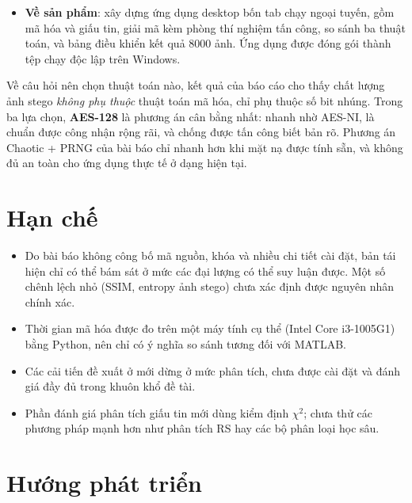 \begin{itemize}
        nêu. Lớp Chaotic + PRNG bị phá hoàn toàn bởi tấn công biết bản rõ và không có tính khuếch tán
        (đổi một điểm ảnh chỉ đổi một byte bản mã). CBC với IV cố định chỉ khuếch tán về phía sau.
        Giấu tin LSB thay thế bị kiểm định $\chi^2$ phát hiện ở $99.84\%$ ảnh stego và bị phá hủy bởi
        nén JPEG hay nhiễu nhẹ.
  \item \textbf{Về sản phẩm}: xây dựng ứng dụng desktop bốn tab chạy ngoại tuyến, gồm mã hóa và giấu
        tin, giải mã kèm phòng thí nghiệm tấn công, so sánh ba thuật toán, và bảng điều khiển kết quả
        8000 ảnh. Ứng dụng được đóng gói thành tệp  chạy độc lập trên Windows.
\end{itemize}

Về câu hỏi nên chọn thuật toán nào, kết quả của báo cáo cho thấy chất lượng ảnh stego \emph{không
phụ thuộc} thuật toán mã hóa, chỉ phụ thuộc số bit nhúng. Trong ba lựa chọn, \textbf{AES-128} là
phương án cân bằng nhất: nhanh nhờ AES-NI, là chuẩn được công nhận rộng rãi, và chống được tấn công
biết bản rõ. Phương án Chaotic + PRNG của bài báo chỉ nhanh hơn khi mặt nạ được tính sẵn, và không đủ
an toàn cho ứng dụng thực tế ở dạng hiện tại.

\section{Hạn chế}

\begin{itemize}
  \item Do bài báo không công bố mã nguồn, khóa và nhiều chi tiết cài đặt, bản tái hiện chỉ có thể
        bám sát ở mức các đại lượng có thể suy luận được. Một số chênh lệch nhỏ (SSIM, entropy ảnh
        stego) chưa xác định được nguyên nhân chính xác.
  \item Thời gian mã hóa được đo trên một máy tính cụ thể (Intel Core i3-1005G1) bằng Python, nên chỉ
        có ý nghĩa so sánh tương đối với MATLAB.
  \item Các cải tiến đề xuất ở  mới dừng ở mức phân tích, chưa được cài đặt và đánh
        giá đầy đủ trong khuôn khổ đề tài.
  \item Phần đánh giá phân tích giấu tin mới dùng kiểm định $\chi^2$; chưa thử các phương pháp mạnh
        hơn như phân tích RS \cite{fridrich2001} hay các bộ phân loại học sâu.
\end{itemize}

\section{Hướng phát triển}

